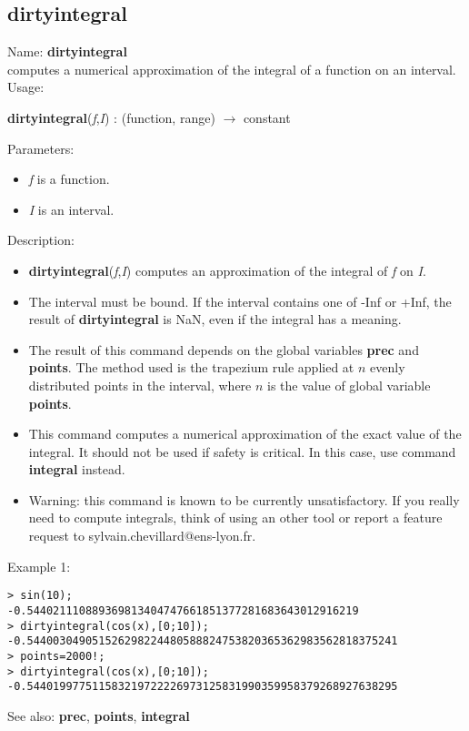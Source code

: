 \subsection{ dirtyintegral }
\noindent Name: \textbf{dirtyintegral}\\
computes a numerical approximation of the integral of a function on an interval.\\

\noindent Usage: 
\begin{center}
\textbf{dirtyintegral}(\emph{f},\emph{I}) : (\textsf{function}, \textsf{range}) $\rightarrow$ \textsf{constant}\\
\end{center}
Parameters: 
\begin{itemize}
\item \emph{f} is a function.
\item \emph{I} is an interval.
\end{itemize}
\noindent Description: \begin{itemize}

\item \textbf{dirtyintegral}(\emph{f},\emph{I}) computes an approximation of the integral of \emph{f} on \emph{I}.

\item The interval must be bound. If the interval contains one of -Inf or +Inf, the 
   result of \textbf{dirtyintegral} is NaN, even if the integral has a meaning.

\item The result of this command depends on the global variables \textbf{prec} and \textbf{points}.
   The method used is the trapezium rule applied at $n$ evenly distributed
   points in the interval, where $n$ is the value of global variable \textbf{points}.

\item This command computes a numerical approximation of the exact value of the 
   integral. It should not be used if safety is critical. In this case, use
   command \textbf{integral} instead.

\item Warning: this command is known to be currently unsatisfactory. If you really
   need to compute integrals, think of using an other tool or report a feature
   request to sylvain.chevillard@ens-lyon.fr.
\end{itemize}
\noindent Example 1: 
\begin{center}\begin{minipage}{15cm}\begin{Verbatim}[frame=single]
> sin(10);
-0.544021110889369813404747661851377281683643012916219
> dirtyintegral(cos(x),[0;10]);
-0.544003049051526298224480588824753820365362983562818375241
> points=2000!;
> dirtyintegral(cos(x),[0;10]);
-0.544019977511583219722226973125831990359958379268927638295
\end{Verbatim}
\end{minipage}\end{center}
See also: \textbf{prec}, \textbf{points}, \textbf{integral}
